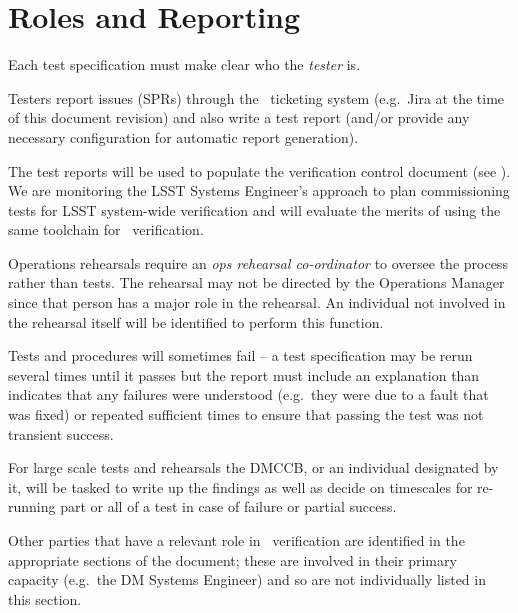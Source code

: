 

\section{Roles and Reporting}

Each test specification must make clear who the {\em tester} is.

Testers report issues (SPRs) through the \product\ ticketing system (e.g.\ Jira at the time of this document revision) and also write a test report (and/or provide any necessary configuration for automatic report generation).

The test reports will be used to populate the verification control document (see ). We are monitoring the LSST Systems Engineer's approach to plan commissioning tests for LSST system-wide verification and will evaluate the merits of using the same toolchain for \product\ verification.

Operations rehearsals require an {\em ops rehearsal co-ordinator} to oversee the process rather than tests. The rehearsal may not be directed by the Operations Manager since that person has a major role in the rehearsal. An individual not involved in the rehearsal itself will be identified to perform this function.

Tests and procedures will sometimes fail -- a test specification may be rerun several times until it passes but the report must include an explanation than indicates that any failures were understood (e.g.\ they were due to a fault that was fixed) or repeated sufficient times to ensure that passing the test was not transient success.

For large scale tests and rehearsals the DMCCB, or an individual designated by it, will be tasked to write up the findings as well as decide on timescales for re-running part or all of a test in case of failure or partial success.

Other parties that have a relevant role in \product\ verification are identified in the appropriate sections of the document; these are involved in their primary capacity (e.g.\ the DM Systems Engineer) and so are not individually listed in this section.

